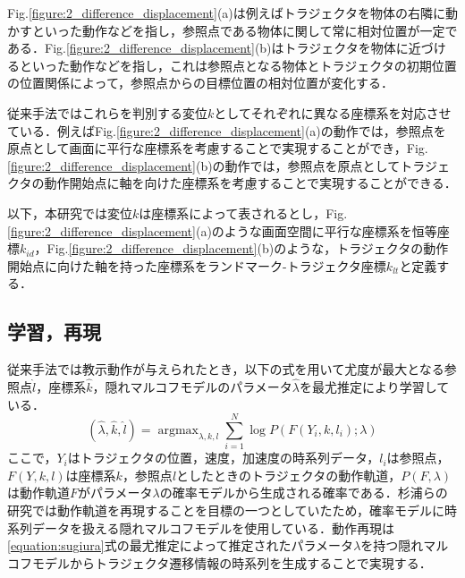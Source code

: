 \clearpage
Fig.\ref{figure:2_difference_displacement}(a)は例えばトラジェクタを物体の右隣に動かすといった動作などを指し，参照点である物体に関して常に相対位置が一定である．Fig.\ref{figure:2_difference_displacement}(b)はトラジェクタを物体に近づけるといった動作などを指し，これは参照点となる物体とトラジェクタの初期位置の位置関係によって，参照点からの目標位置の相対位置が変化する．

従来手法ではこれらを判別する変位$k$としてそれぞれに異なる座標系を対応させている．例えばFig.\ref{figure:2_difference_displacement}(a)の動作では，参照点を原点として画面に平行な座標系を考慮することで実現することができ，Fig.\ref{figure:2_difference_displacement}(b)の動作では，参照点を原点としてトラジェクタの動作開始点に軸を向けた座標系を考慮することで実現することができる．

以下，本研究では変位$k$は座標系によって表されるとし，Fig.\ref{figure:2_difference_displacement}(a)のような画面空間に平行な座標系を恒等座標$k_{id}$，Fig.\ref{figure:2_difference_displacement}(b)のような，トラジェクタの動作開始点に向けた軸を持った座標系をランドマーク-トラジェクタ座標$k_{lt}$と定義する．

\subsection{学習，再現}

従来手法では教示動作が与えられたとき，以下の式を用いて尤度が最大となる参照点$\hat{l}$，座標系$\hat{k}$，隠れマルコフモデルのパラメータ$\hat{λ}$を最尤推定により学習している．
\begin{equation}
	\label{equation:sugiura}
	(\hat{λ} , \hat{k} , \hat{l}) = \mathop{\arg\max}_{λ , k , l}\sum_{i=1}^{N}\log P(F(Y_{i} , k , l_{i}) ; λ)
\end{equation}
ここで，$Y_{i}$はトラジェクタの位置，速度，加速度の時系列データ，$l_{i}$は参照点，$F(Y , k , l)$は座標系$k$，参照点$l$としたときのトラジェクタの動作軌道，$P(F,λ)$は動作軌道$F$がパラメータ$λ$の確率モデルから生成される確率である．杉浦らの研究では動作軌道を再現することを目標の一つとしていたため，確率モデルに時系列データを扱える隠れマルコフモデルを使用している．動作再現は\ref{equation:sugiura}式の最尤推定によって推定されたパラメータ$λ$を持つ隠れマルコフモデルからトラジェクタ遷移情報の時系列を生成することで実現する．
